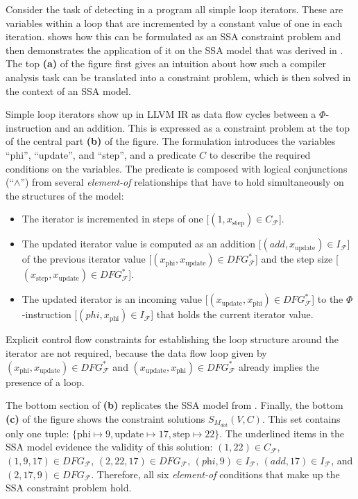     Consider the task of detecting in a program all simple loop iterators.
    These are variables within a loop that are incremented by a constant value
    of one in each iteration.
     shows how this can be formulated as an
    SSA constraint problem and then demonstrates the application of it on the
    SSA model that was derived in .
    The top {\bf(a)} of the figure first gives an intuition about how such a
    compiler analysis task can be translated into a constraint problem, which is
    then solved in the context of an SSA model.

    Simple loop iterators show up in LLVM IR as data flow cycles between a
    $\Phi$-instruction and an addition.
    This is expressed as a constraint problem at the top of the central part
    {\bf(b)} of the figure.
    The formulation introduces the variables
    ``phi'', ``update'', and ``step'', and a predicate $C$ to describe the
    required conditions on the variables.
    The predicate is composed with logical conjunctions (``$\land$'') from
    several {\em element-of} relationships that have to hold simultaneously on
    the structures of the model:
    \begin{itemize}
        \item The iterator is incremented in steps of one
              [$(1,x_\text{step})\in C_\mathcal{F}$].
        \item The updated iterator value is computed as an addition
              [$(add,x_\text{update})\in I_\mathcal{F}$] of the previous
              iterator value
              [$(x_\text{phi},x_\text{update})\in DFG_\mathcal{F}^*$] and the
              step size
              [$(x_\text{step},x_\text{update})\in DFG_\mathcal{F}^*$].
        \item The updated iterator is an incoming value
              [$(x_\text{update},x_\text{phi})\in DFG_\mathcal{F}^*$] to the
              $\Phi$-instruction [$(phi,x_\text{phi})\in I_\mathcal{F}$] that
              holds the current iterator value.
    \end{itemize}
    Explicit control flow constraints for establishing the loop structure around
    the iterator are not required, because the data flow loop given by
    $(x_\text{phi},x_\text{update})\in DFG_\mathcal{F}^*$ and
    $(x_\text{update},x_\text{phi})\in DFG_\mathcal{F}^*$ already implies
    the presence of a loop.

    The bottom section of  {\bf(b)} replicates the
    SSA model from .
    Finally, the bottom {\bf(c)} of the figure shows the constraint solutions
    $S_{M_{dot}}(V,C)$.
    This set contains only one tuple:
    $\{\text{phi}\mapsto9,\text{update}\mapsto17,\text{step}\mapsto22\}$.
    The underlined items in the SSA model evidence the validity of this
    solution:
    $(1,22)\in C_\mathcal F$, $(1,9,17)\in DFG_\mathcal F$,
    $(2,22,17)\in DFG_\mathcal F$, \mbox{$(\textit{phi},9)\in I_\mathcal F$},
    $(\textit{add},17)\in I_\mathcal F$, and $(2,17,9)\in DFG_\mathcal F$.
    Therefore, all six {\it element-of} conditions that make up the SSA
    constraint problem hold.

